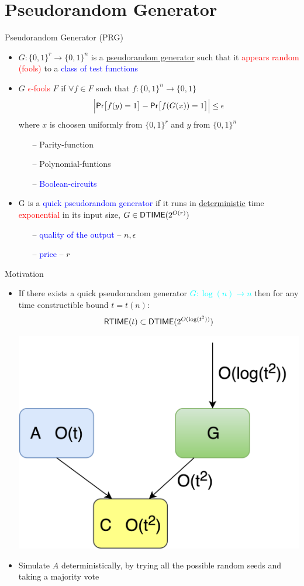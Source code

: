 \documentclass[xcolor={table,dvipsnames,usenames}]{beamer}
\begin{document}
\section{Pseudorandom Generator}
\begin{frame}{Pseudorandom Generator (PRG)}
\begin{itemize}
	\pause
	\item $G: \{0,1\}^r \rightarrow \{0,1\}^n$ is a {\underline{pseudorandom generator}} such that it \textcolor{red}{appears random (fools)} to a \textcolor{blue}{class of test functions}
	\pause
	\item $G$ \textcolor{red}{$\epsilon$-fools} $F$ if $\forall f \in F$ such that $f: \{0,1\}^n \rightarrow \{0,1\}$
	$$\Big|\mathsf{Pr}\big[f(y) = 1\big] -  \mathsf{Pr}\big[f(G(x)) = 1 \big]\Big| \leq \epsilon$$
	where $x$ is choosen uniformly from $\{0,1\}^r$ and $y$ from $\{0,1\}^n$
	\pause
	\begin{itemize}
		\item[--] Parity-function
		\item[--] Polynomial-funtions
		\item[--] \textcolor{blue}{Boolean-circuits}
	\end{itemize}
	\pause
	\item G is a \textcolor{blue}{quick pseudorandom generator} if it runs in \underline{deterministic} time \textcolor{red}{exponential} in its input size, $G \in \mathsf{DTIME} (2^{O(r)})$
	\pause 
	\begin{itemize}
		\item[--] \textcolor{blue}{quality of the output} -- $n,\epsilon$
		\item[--] \textcolor{blue}{price} -- $r$
	\end{itemize}
\end{itemize}
\end{frame}
\begin{frame}{Motivation}
\begin{itemize}
	\pause
	\item If there exists a quick pseudorandom generator \textcolor{cyan}{$G: \log(n) \rightarrow n$} then for any time constructible bound $t=t(n):$ 
	\textcolor{red}{$$\mathsf{RTIME}(t) \subset \mathsf{DTIME}(2^{O(\log(t^2))})$$}
	\pause
	\begin{center}
			        \includegraphics[width=0.4\columnwidth]{figures/RandomSimulation}
	\end{center}
\pause
\item  Simulate $A$ deterministically, by trying all the possible random seeds and taking a majority vote
\end{itemize}
\end{frame}
\end{document}
